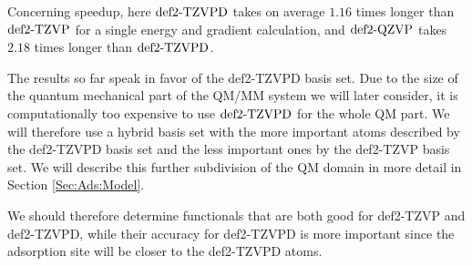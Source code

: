 Concerning speedup, here $\text{def2-TZVPD}$ takes on average $1.16$ times longer than
$\text{def2-TZVP}$ for a single energy and gradient calculation, and $\text{def2-QZVP}$ takes $2.18$
times longer than $\text{def2-TZVPD}$.

The results so far speak in favor of the def2-TZVPD basis set. Due 
to the size of the quantum mechanical part of the QM/MM system we will later consider,
it is computationally too expensive to use $\text{def2-TZVPD}$ for the whole
QM part. We will therefore use a hybrid basis set with the more important atoms
described by the def2-TZVPD basis set and the less important ones by the
def2-TZVP basis set. We will describe this further subdivision of the QM domain
in more detail in Section \ref{Sec:Ads:Model}.

We should therefore determine functionals that are both good for def2-TZVP and def2-TZVPD,
while their accuracy for def2-TZVPD is more important since the adsorption site will
be closer to the def2-TZVPD atoms. 
